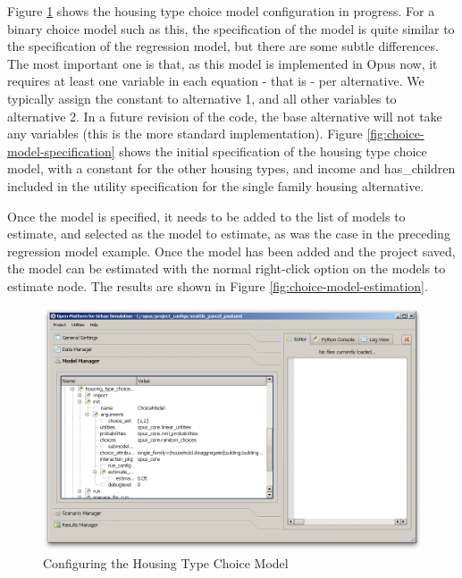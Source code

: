 Figure \ref{fig:configure-choice-model} shows the housing type choice model configuration in progress.  For a binary choice model such as this, the specification of the model is quite similar to the specification of the regression model, but there are some subtle differences.  The most important one is that, as this model is implemented in Opus now, it requires at least one variable in each equation - that is - per alternative.  We typically assign the constant to alternative 1, and all other variables to alternative 2.  In a future revision of the code, the base alternative will not take any variables (this is the more standard implementation).  Figure \ref{fig:choice-model-specification} shows the initial specification of the housing type choice model, with a constant for the other housing types, and income and has\_children included in the utility specification for the single family housing alternative. 

Once the model is specified, it needs to be added to the list of models to estimate, and selected as the model to estimate, as was the case in the preceding regression model example.  Once the model has been added and the project saved, the model can be estimated with the normal right-click option on the models to estimate node.  The results are shown in Figure \ref{fig:choice-model-estimation}.

\begin{figure}[htp]
\begin{center}
\includegraphics[scale=0.35]{graphics/configure-choice-model.png}
\end{center}
\caption{Configuring the Housing Type Choice Model}
\label{fig:configure-choice-model}
\end{figure}

